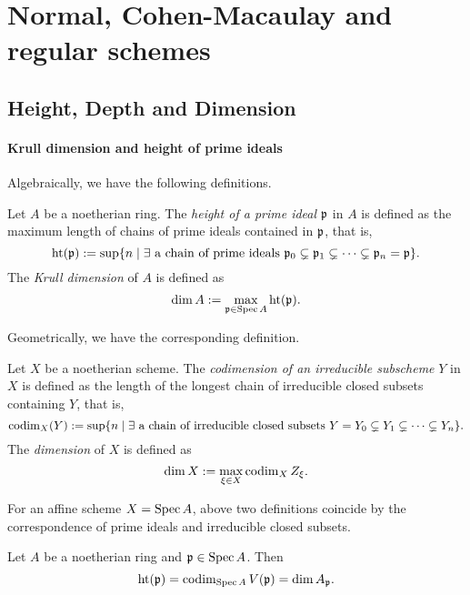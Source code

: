 \section{Normal, Cohen-Macaulay and regular schemes}

\subsection{Height, Depth and Dimension}

    \paragraph{Krull dimension and height of prime ideals}
    Algebraically, we have the following definitions.
    \begin{definition}
        Let $A$ be a noetherian ring.
        The \textit{height of a prime ideal} ${\mathfrak{p}}$ in $A$ is defined as the maximum length of chains of prime ideals contained in ${\mathfrak{p}}$, that is, 
        \[ \operatorname{ht}({\mathfrak{p}}) := \sup\{ n \mid \exists \text{ a chain of prime ideals } {\mathfrak{p}}_0 \subsetneq {\mathfrak{p}}_1 \subsetneq \cdots \subsetneq {\mathfrak{p}}_n = {\mathfrak{p}}\}. \] 
        The \textit{Krull dimension} of $A$ is defined as 
        \[ \dim A := \max_{{\mathfrak{p}} \in \operatorname{Spec} A}\operatorname{ht}({\mathfrak{p}}). \]
    \end{definition}

    Geometrically, we have the corresponding definition.
    \begin{definition}
        Let $X$ be a noetherian scheme.
        The \textit{codimension of an irreducible subscheme} $Y$ in $X$ is defined as the length of the longest chain of irreducible closed subsets containing $Y$, that is, 
        \[ \operatorname{codim}_X(Y) := \sup\{ n \mid \exists \text{ a chain of irreducible closed subsets } Y = Y_0 \subsetneq Y_1 \subsetneq \cdots \subsetneq Y_n\}. \] 
        The \textit{dimension} of $X$ is defined as
        \[ \dim X := \max_{\xi \in X}\operatorname{codim}_X Z_\xi. \]
    \end{definition}

    For an affine scheme $X = \operatorname{Spec} A$, above two definitions coincide by the correspondence of prime ideals and irreducible closed subsets.

    \begin{proposition}
        Let $A$ be a noetherian ring and ${\mathfrak{p}} \in \operatorname{Spec} A$.
        Then 
        \[ \operatorname{ht}({\mathfrak{p}}) = \operatorname{codim}_{\operatorname{Spec} A} V({\mathfrak{p}}) = \dim A_{{\mathfrak{p}}}. \]
    \end{proposition}

